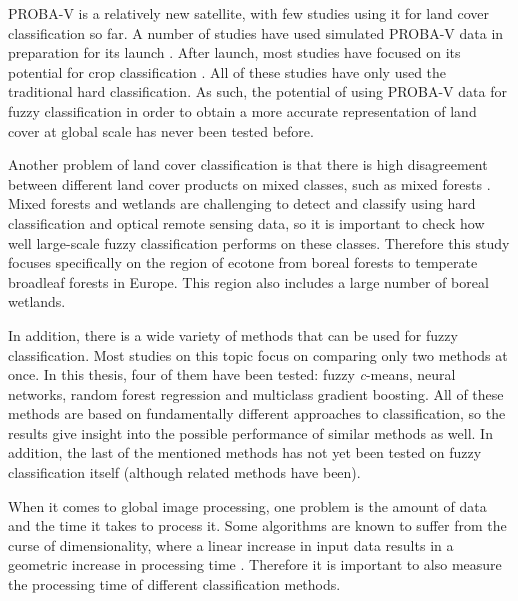 \documentclass[a4paper,12pt]{scrbook}
\begin{document}
PROBA-V is a relatively new satellite, with few studies using it for land cover classification so far. A number of studies have used simulated PROBA-V data in preparation for its launch \citep{stathakis2014probavurban,roumenina2013probavcrops,bartalev2014probavboreal}. After launch, most studies have focused on its potential for crop classification \citep{roumenina2015probavcrops,durgun2016crop,lambert2016cropland}. All of these studies have only used the traditional hard classification. As such, the potential of using PROBA-V data for fuzzy classification in order to obtain a more accurate representation of land cover at global scale has never been tested before.

Another problem of land cover classification is that there is high disagreement between different land cover products on mixed classes, such as mixed forests \citep{Herold2008lccomparison}. Mixed forests and wetlands are challenging to detect and classify using hard classification and optical remote sensing data, so it is important to check how well large-scale fuzzy classification performs on these classes. Therefore this study focuses specifically on the region of ecotone from boreal forests to temperate broadleaf forests in Europe. This region also includes a large number of boreal wetlands. 

In addition, there is a wide variety of methods that can be used for fuzzy classification. Most studies on this topic focus on comparing only two methods at once. In this thesis, four of them have been tested: fuzzy \textit{c}-means, neural networks, random forest regression and multiclass gradient boosting. All of these methods are based on fundamentally different approaches to classification, so the results give insight into the possible performance of similar methods as well. In addition, the last of the mentioned methods has not yet been tested on fuzzy classification itself (although related methods have been).

When it comes to global image processing, one problem is the amount of data and the time it takes to process it. Some algorithms are known to suffer from the curse of dimensionality, where a linear increase in input data results in a geometric increase in processing time \citep{walton2008subpixelrf}. Therefore it is important to also measure the processing time of different classification methods.
\end{document}
